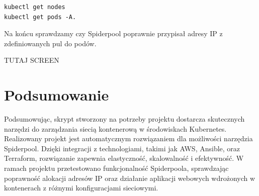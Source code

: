 \documentclass[onecolumn,12pt]{article}
\begin{document}
\begin{verbatim}
kubectl get nodes
kubectl get pods -A.
\end{verbatim}

Na końcu sprawdzamy czy Spiderpool poprawnie przypisał adresy IP z zdefiniowanych pul do podów.

TUTAJ SCREEN

\section{Podsumowanie}

Podsumowując, skrypt stworzony na potrzeby projektu dostarcza skutecznych narzędzi do zarządzania siecią kontenerową w środowiskach Kubernetes. Realizowany projekt jest automatycznym rozwiązaniem
dla możliwości narzędzia Spiderpool. Dzięki integracji z technologiami, takimi jak AWS, Ansible, oraz Terraform, rozwiązanie zapewnia elastyczność, skalowalność i efektywność. W ramach projektu przetestowano funkcjonalność Spiderpoola, sprawdzając poprawność alokacji adresów IP oraz 
działanie aplikacji webowych wdrożonych w kontenerach z różnymi konfiguracjami sieciowymi.

%
\end{document}
